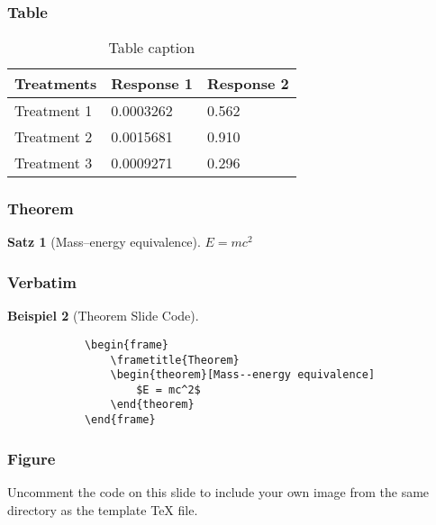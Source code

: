 \documentclass{beamer}
\theoremstyle{plain}
\newtheorem{thm}{Satz}[section]
\theoremstyle{definition}
\newtheorem{bsp}[thm]{Beispiel}
\theoremstyle{rem}
\begin{document}
\begin{frame}
    \frametitle{Table}
    \begin{table}
        \begin{tabular}{l l l}
            \toprule
            \textbf{Treatments} & \textbf{Response 1} & \textbf{Response 2}\\
            \midrule
            Treatment 1 & 0.0003262 & 0.562 \\
            Treatment 2 & 0.0015681 & 0.910 \\
            Treatment 3 & 0.0009271 & 0.296 \\
            \bottomrule
        \end{tabular}
        \caption{Table caption}
    \end{table}
\end{frame}


\begin{frame}
    \frametitle{Theorem}
    \begin{thm}[Mass--energy equivalence]
        $E = mc^2$
    \end{thm}
\end{frame}


\begin{frame}[fragile] %
    \frametitle{Verbatim}
    \begin{bsp}[Theorem Slide Code]
        \begin{verbatim}
            \begin{frame}
                \frametitle{Theorem}
                \begin{theorem}[Mass--energy equivalence]
                    $E = mc^2$
                \end{theorem}
            \end{frame}\end{verbatim}
    \end{bsp}
\end{frame}


\begin{frame}
    \frametitle{Figure}
    Uncomment the code on this slide to include your own image from the same directory as the template TeX file.
\end{frame}
\end{document}
